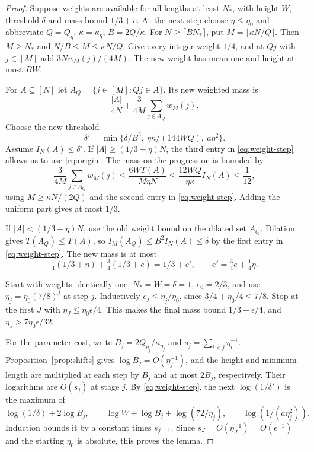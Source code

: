 \documentclass[11pt,reqno]{amsart}
\numberwithin{equation}{section}
\begin{document}
\begin{proof}
Suppose weights are available for all lengths at least \(N_*\), with
height \(W\), threshold \(\delta\) and mass bound \(1/3+e\). At the next
step choose \(\eta\le\eta_0\) and abbreviate \(Q=Q_\eta\),
\(\kappa=\kappa_\eta\), \(B=2Q/\kappa\). For \(N\ge\lceil BN_*\rceil\),
put \(M=\lfloor\kappa N/Q\rfloor\). Then \(M\ge N_*\) and
\(N/B\le M\le\kappa N/Q\). Give every integer weight \(1/4\), and
at \(Qj\) with \(j\in[M]\) add \(3Nw_M(j)/(4M)\). The new weight
has mean one and height at most \(BW\).

For \(A\subseteq[N]\) let \(A_Q=\{j\in[M]:Qj\in A\}\).
Its new weighted mass is
\[
 \frac{|A|}{4N}+\frac{3}{4M}\sum_{j\in A_Q} w_M(j).
\]
Choose the new threshold
\begin{equation}\label{eq:weight-step}
 \delta'=\min\{\delta/B^2,\ \eta\kappa/(144WQ),\ a\eta^2\}.
\end{equation}
Assume \(I_N(A)\le\delta'\). If \(|A|\ge(1/3+\eta)N\),
the third entry in \eqref{eq:weight-step} allows us to use
\eqref{eq:origin}. The mass on the progression is bounded by
\[
 \frac{3}{4M}\sum_{j\in A_Q}w_M(j)
 \le \frac{6W T(A)}{M\eta N}
 \le \frac{12W Q}{\eta\kappa}I_N(A)
 \le \frac1{12},
\]
using \(M\ge\kappa N/(2Q)\) and the second entry in
\eqref{eq:weight-step}. Adding the uniform part gives at most \(1/3\).

If \(|A|<(1/3+\eta)N\), use the old weight bound on the
dilated set \(A_Q\). Dilation gives \(T(A_Q)\le T(A)\),
so \(I_M(A_Q)\le B^2I_N(A)\le\delta\) by the first entry in
\eqref{eq:weight-step}. The new mass is at most
\[
 \tfrac14(1/3+\eta)+\tfrac34(1/3+e)=1/3+e',
 \qquad e'=\tfrac34e+\tfrac14\eta.
\]

Start with weights identically one, \(N_*=W=\delta=1\), \(e_0=2/3\),
and use \(\eta_j=\eta_0(7/8)^j\) at step \(j\).
Inductively \(e_j\le\eta_j/\eta_0\), since
\(3/4+\eta_0/4\le7/8\). Stop at the first \(J\) with
\(\eta_J\le\eta_0\epsilon/4\). This makes the final mass bound
\(1/3+\epsilon/4\), and \(\eta_J>7\eta_0\epsilon/32\).

For the parameter cost, write \(B_j=2Q_{\eta_j}/\kappa_{\eta_j}\)
and \(s_j=\sum_{i<j}\eta_i^{-1}\). Proposition~\ref{prop:shifts}
gives \(\log B_j=O(\eta_j^{-1})\), and the height and minimum length
are multiplied at each step by \(B_j\) and at most \(2B_j\),
respectively. Their logarithms are \(O(s_j)\) at stage \(j\).
By \eqref{eq:weight-step}, the next \(\log(1/\delta')\) is the
maximum of
\[
 \log(1/\delta)+2\log B_j,\qquad
 \log W+\log B_j+\log(72/\eta_j),\qquad
 \log(1/(a\eta_j^2)).
\]
Induction bounds it by a constant times \(s_{j+1}\). Since
\(s_J=O(\eta_J^{-1})=O(\epsilon^{-1})\) and the starting
\(\eta_0\) is absolute, this proves the lemma.
\end{proof}
\end{document}

